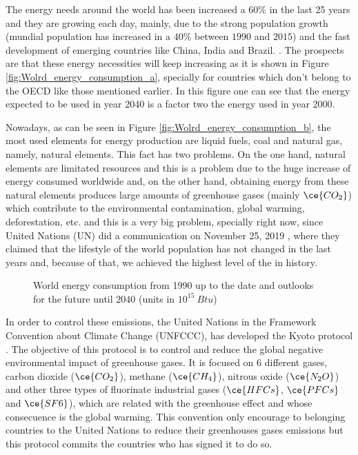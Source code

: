 The energy needs around the world has been increased a $60\%$ in the last 25 years and they are growing each day, mainly, due to the strong population growth (mundial population has increased in a $40\%$ between $1990$ and $2015$) and the fast development of emerging countries like China, India and Brazil. \cite{Renovables}. The prospects are that these energy necessities will keep increasing as it is shown in Figure \ref{fig:Wolrd_energy_consumption_a}, specially for countries which don't belong to the OECD like those mentioned earlier. In this figure one can see that the energy expected to be used in year 2040 is a factor two the energy used in year 2000.

Nowadays, as can be seen in Figure \ref{fig:Wolrd_energy_consumption_b}, the most used elements for energy production are liquid fuels, coal and natural gas, namely, natural elements. This fact has two problems. On the one hand, natural elements are limitated resources and this is a problem due to the huge increase of energy consumed worldwide and, on the other hand, obtaining energy from these natural elements produces large amounts of greenhouse gases (mainly $\ce{CO_2}$) which contribute to the environmental contamination, global warming, deforestation, etc. and this is a very big problem, specially right now, since United Nations (UN) did a communication on November 25, 2019 \cite{HighestCO2}, where they claimed that the lifestyle of the world population has not changed in the last years and, because of that, we achieved the highest level of the  in history.

\begin{figure}[]
 \centering
 \caption{World energy consumption from 1990 up to the date and outlooks for the future until $2040$ (units in $10^{15}~Btu$) \cite{EIA}}
 \label{fig:Wolrd_energy_consumption} 
\end{figure}

In order to control these emissions, the United Nations in the Framework Convention about Climate Change (UNFCCC), has developed the Kyoto protocol \cite{Kyoto}. The objective of this protocol is to control and reduce the global negative environmental impact of greenhouse gases. It is focused on 6 different gases, carbon dioxide ($\ce{CO_2}$), methane ($\ce{CH_4}$), nitrous oxide ($\ce{N_2 O}$) and other three types of fluorinate industrial gases ($\ce{HFCs}$, $\ce{PFCs}$ and $\ce{SF6}$), which are related with the greenhouse effect and whose consecuence is the global warming. This convention only encourage to belonging countries to the United Nations to reduce their greenhouses gases emissions but this protocol commits the countries who has signed it to do so.

